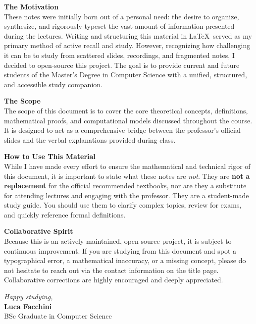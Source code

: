 
\noindent \textbf{The Motivation}\\
These notes were initially born out of a personal need: the desire to organize, synthesize, and rigorously typeset the vast amount of information presented during the lectures. Writing and structuring this material in \LaTeX\ served as my primary method of active recall and study. However, recognizing how challenging it can be to study from scattered slides, recordings, and fragmented notes, I decided to open-source this project. The goal is to provide current and future students of the Master's Degree in Computer Science with a unified, structured, and accessible study companion.

\vspace{1em}
\noindent \textbf{The Scope}\\
The scope of this document is to cover the core theoretical concepts, definitions, mathematical proofs, and computational models discussed throughout the course. It is designed to act as a comprehensive bridge between the professor's official slides and the verbal explanations provided during class. 

\vspace{1em}
\noindent \textbf{How to Use This Material}\\
While I have made every effort to ensure the mathematical and technical rigor of this document, it is important to state what these notes are \textit{not}. They are \textbf{not a replacement} for the official recommended textbooks, nor are they a substitute for attending lectures and engaging with the professor. They are a student-made study guide. You should use them to clarify complex topics, review for exams, and quickly reference formal definitions.

\vspace{1em}
\noindent \textbf{Collaborative Spirit}\\
Because this is an actively maintained, open-source project, it is subject to continuous improvement. If you are studying from this document and spot a typographical error, a mathematical inaccuracy, or a missing concept, please do not hesitate to reach out via the contact information on the title page. Collaborative corrections are highly encouraged and deeply appreciated.

\vspace{2em}
\noindent \textit{Happy studying,}\\
\textbf{Luca Facchini}\\
BSc Graduate in Computer Science
